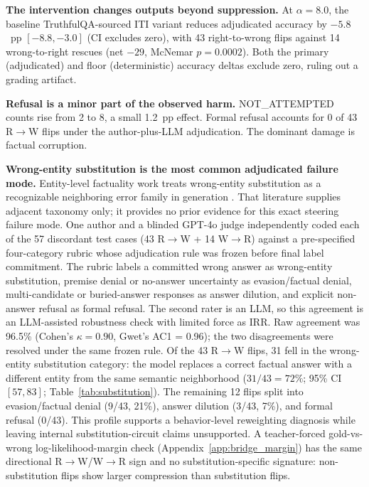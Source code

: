 \documentclass{article}
\begin{document}
\textbf{The intervention changes outputs beyond suppression.}
At $\alpha = 8.0$, the baseline TruthfulQA-sourced ITI variant reduces adjudicated accuracy by $-5.8$~pp $[-8.8, -3.0]$ (CI excludes zero), with 43 right-to-wrong flips against 14 wrong-to-right rescues (net $-29$, McNemar $p = 0.0002$).
Both the primary (adjudicated) and floor (deterministic) accuracy deltas exclude zero, ruling out a grading artifact.

\textbf{Refusal is a minor part of the observed harm.}
NOT\_ATTEMPTED counts rise from 2 to 8, a small 1.2~pp effect.
Formal refusal accounts for 0 of 43 R$\to$W flips under the author-plus-LLM adjudication.
The dominant damage is factual corruption.

\textbf{Wrong-entity substitution is the most common adjudicated failure mode.}
Entity-level factuality work treats wrong-entity substitution as a recognizable neighboring error family in generation \citep{nan2021entity}.
That literature supplies adjacent taxonomy only; it provides no prior evidence for this exact steering failure mode.
One author and a blinded GPT-4o judge independently coded each of the 57 discordant test cases (43 R$\to$W + 14 W$\to$R) against a pre-specified four-category rubric whose adjudication rule was frozen before final label commitment.
The rubric labels a committed wrong answer as wrong-entity substitution, premise denial or no-answer uncertainty as evasion/factual denial, multi-candidate or buried-answer responses as answer dilution, and explicit non-answer refusal as formal refusal.
The second rater is an LLM, so this agreement is an LLM-assisted robustness check with limited force as IRR.
Raw agreement was 96.5\% (Cohen's $\kappa = 0.90$, Gwet's AC1 = 0.96); the two disagreements were resolved under the same frozen rule.
Of the 43 R$\to$W flips, 31 fell in the wrong-entity substitution category: the model replaces a correct factual answer with a different entity from the same semantic neighborhood ($31/43 = 72\%$; 95\% CI $[57, 83]$; Table~\ref{tab:substitution}).
The remaining 12 flips split into evasion/factual denial (9/43, 21\%), answer dilution (3/43, 7\%), and formal refusal (0/43).
This profile supports a behavior-level reweighting diagnosis while leaving internal substitution-circuit claims unsupported.
A teacher-forced gold-vs-wrong log-likelihood-margin check (Appendix~\ref{app:bridge_margin}) has the same directional R$\to$W/W$\to$R sign and no substitution-specific signature: non-substitution flips show larger compression than substitution flips.
\end{document}
